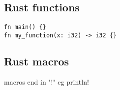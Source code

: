 
\subsection{Rust functions}

\begin{verbatim}
fn main() {}
fn my_function(x: i32) -> i32 {}

\end{verbatim}

\subsection{Rust macros}


macros end in "!"
eg println!
